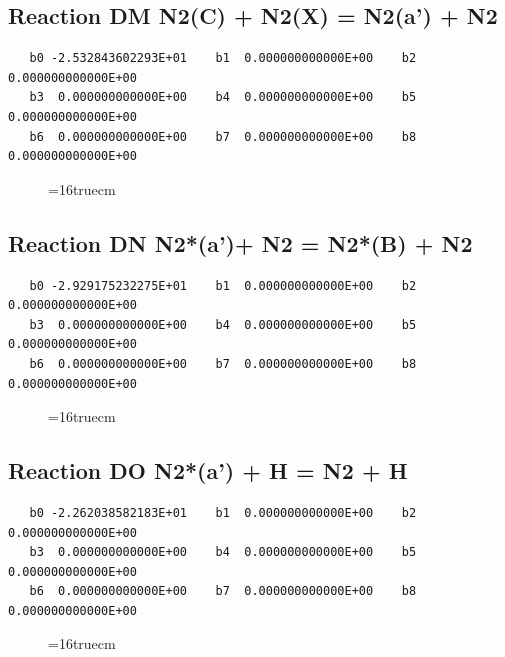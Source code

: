 \documentclass[12pt,dvipdfm]{article}
\begin{document}
\subsection{
Reaction DM N2(C) + N2(X)  = N2(a') + N2}
\begin{small}\begin{verbatim}
   b0 -2.532843602293E+01    b1  0.000000000000E+00    b2  0.000000000000E+00
   b3  0.000000000000E+00    b4  0.000000000000E+00    b5  0.000000000000E+00
   b6  0.000000000000E+00    b7  0.000000000000E+00    b8  0.000000000000E+00
   \end{verbatim}\end{small}
\begin{figure}[h!]
\label{n2rates}
\epsfxsize=16truecm
\end{figure}
\newpage

\subsection{
Reaction DN N2*(a')+ N2  = N2*(B) + N2}
\begin{small}\begin{verbatim}
   b0 -2.929175232275E+01    b1  0.000000000000E+00    b2  0.000000000000E+00
   b3  0.000000000000E+00    b4  0.000000000000E+00    b5  0.000000000000E+00
   b6  0.000000000000E+00    b7  0.000000000000E+00    b8  0.000000000000E+00
   \end{verbatim}\end{small}
\begin{figure}[h!]
\label{n2rates}
\epsfxsize=16truecm
\end{figure}
\newpage

\subsection{
Reaction DO N2*(a') + H = N2 + H}
\begin{small}\begin{verbatim}
   b0 -2.262038582183E+01    b1  0.000000000000E+00    b2  0.000000000000E+00
   b3  0.000000000000E+00    b4  0.000000000000E+00    b5  0.000000000000E+00
   b6  0.000000000000E+00    b7  0.000000000000E+00    b8  0.000000000000E+00
   \end{verbatim}\end{small}
\begin{figure}[h!]
\label{n2rates}
\epsfxsize=16truecm
\end{figure}
\newpage
\end{document}
